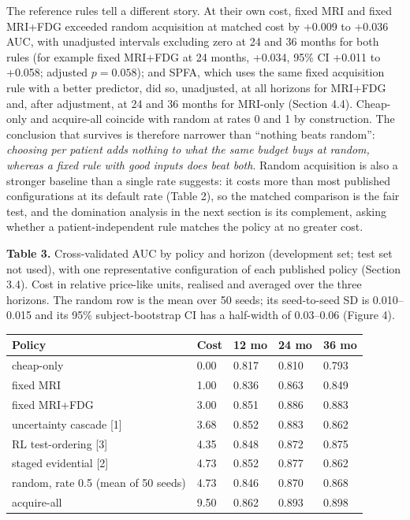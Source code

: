 \documentclass[12pt,twoside]{article}
\begin{document}
\begin{spacing}{1.0}
The reference rules tell a different story. At their own cost, fixed MRI and
fixed MRI+FDG exceeded random acquisition at matched cost by +0.009 to +0.036
AUC, with unadjusted intervals excluding zero at 24 and 36 months for both
rules (for example fixed MRI+FDG at 24 months, +0.034, 95\% CI +0.011 to
+0.058; adjusted $p=0.058$);
and SPFA, which uses the same fixed acquisition rule with a better predictor,
did so, unadjusted, at all horizons for MRI+FDG and, after adjustment, at 24
and 36 months for MRI-only (Section 4.4). Cheap-only and acquire-all coincide with
random at rates 0 and 1 by construction. The conclusion that survives is
therefore narrower than ``nothing beats random'': \emph{choosing per patient
adds nothing to what the same budget buys at random, whereas a fixed rule
with good inputs does beat both}. Random acquisition is also a stronger
baseline than a single rate suggests: it costs more than most published
configurations at its default rate (Table 2), so the matched comparison is
the fair test, and the domination analysis in the next section is its
complement, asking whether a patient-independent rule matches the policy at
no greater cost.

\begin{table}[!htbp]
\centering
\textbf{Table 3.} Cross-validated AUC by policy and horizon (development
set; test set not used), with one representative configuration of each
published policy (Section 3.4). Cost in relative price-like units, realised
and averaged over the three horizons. The random row is the mean over 50
seeds; its seed-to-seed SD is 0.010--0.015 and its 95\% subject-bootstrap CI
has a half-width of 0.03--0.06 (Figure 4).\\\vspace{5pt}
\begin{tabular}{|M{5.2cm}|M{1.5cm}|M{1.6cm}|M{1.6cm}|M{1.6cm}|}
\hline
\textbf{Policy} & \textbf{Cost} & \textbf{12 mo} & \textbf{24 mo} & \textbf{36 mo} \\
\hline
cheap-only & 0.00 & 0.817 & 0.810 & 0.793 \\\hline
fixed MRI & 1.00 & 0.836 & 0.863 & 0.849 \\\hline
fixed MRI+FDG & 3.00 & 0.851 & 0.886 & 0.883 \\\hline
uncertainty cascade [1] & 3.68 & 0.852 & 0.883 & 0.862 \\\hline
RL test-ordering [3] & 4.35 & 0.848 & 0.872 & 0.875 \\\hline
staged evidential [2] & 4.73 & 0.852 & 0.877 & 0.862 \\\hline
random, rate 0.5 (mean of 50 seeds) & 4.73 & 0.846 & 0.870 & 0.868 \\\hline
acquire-all & 9.50 & 0.862 & 0.893 & 0.898 \\\hline
\end{tabular}
\end{table}



\end{spacing}
\end{document}
